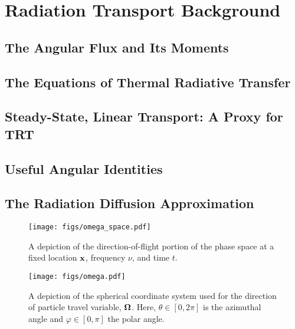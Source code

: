 \documentclass[../doc.tex]{subfiles}
\begin{document}
\chapter{Radiation Transport Background} \label{chap:transport}
\section{The Angular Flux and Its Moments}
\section{The Equations of Thermal Radiative Transfer}
\section{Steady-State, Linear Transport: A Proxy for TRT}
\section{Useful Angular Identities}
\section{The Radiation Diffusion Approximation}

\begin{figure}
\centering
\texttt{[image: figs/omega\_space.pdf]}
\caption{A depiction of the direction-of-flight portion of the phase space at a fixed location $\boldsymbol{\mathrm{x}}$, frequency $\nu$, and time $t$. }
\label{trans:omega_space_diag}
\end{figure}

\begin{figure}
\centering
\texttt{[image: figs/omega.pdf]}
\caption{A depiction of the spherical coordinate system used for the direction of particle travel variable, $\boldsymbol{\Omega}$. Here, $\theta \in [0,2\pi]$ is the azimuthal angle and $\varphi \in [0,\pi]$ the polar angle. }
\label{trans:omega_diagram}
\end{figure}
\end{document}
